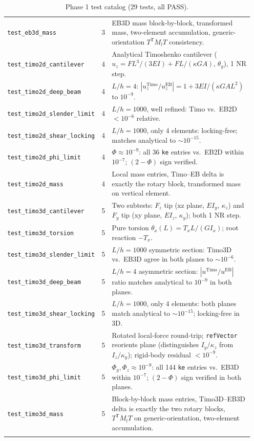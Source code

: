 \documentclass[11pt,a4paper]{book}
\begin{document}
\begin{longtable}{p{4.5cm} l p{8cm}}
\texttt{test\_eb3d\_mass}            & 3  & EB3D mass block-by-block, transformed mass, two-element accumulation, generic-orientation $T^\mathsf{T} M_l T$ consistency. \\
\texttt{test\_timo2d\_cantilever}    & 4  & Analytical Timoshenko cantilever ($u_z = FL^3/(3EI) + FL/(\kappa GA)$, $\theta_y$), 1 NR step. \\
\texttt{test\_timo2d\_deep\_beam}    & 4  & $L/h = 4$: $|u_z^{\text{Timo}}/u_z^{\text{EB}}| = 1 + 3 EI/(\kappa GA L^2)$ to $10^{-9}$. \\
\texttt{test\_timo2d\_slender\_limit}& 4  & $L/h = 1000$, well refined: Timo vs.\ EB2D $< 10^{-6}$ relative. \\
\texttt{test\_timo2d\_shear\_locking}& 4  & $L/h = 1000$, only 4 elements: locking-free; matches analytical to $\sim 10^{-15}$. \\
\texttt{test\_timo2d\_phi\_limit}    & 4  & $\Phi \approx 10^{-9}$: all 36 \texttt{ke} entries vs.\ EB2D within $10^{-7}$; $(2-\Phi)$ sign verified. \\
\texttt{test\_timo2d\_mass}          & 4  & Local mass entries, Timo--EB delta is exactly the rotary block, transformed mass on vertical element. \\
\texttt{test\_timo3d\_cantilever}    & 5  & Two subtests: $F_z$ tip (xz plane, $E I_y$, $\kappa_z$) and $F_y$ tip (xy plane, $E I_z$, $\kappa_y$); both 1 NR step. \\
\texttt{test\_timo3d\_torsion}       & 5  & Pure torsion $\theta_x(L) = T_x L/(GI_x)$; root reaction $-T_x$. \\
\texttt{test\_timo3d\_slender\_limit}& 5  & $L/h = 1000$ symmetric section: Timo3D vs.\ EB3D agree in both planes to $\sim 10^{-6}$. \\
\texttt{test\_timo3d\_deep\_beam}    & 5  & $L/h = 4$ asymmetric section: $|u^{\text{Timo}}/u^{\text{EB}}|$ ratio matches analytical to $10^{-9}$ in both planes. \\
\texttt{test\_timo3d\_shear\_locking}& 5  & $L/h = 1000$, only 4 elements: both planes match analytical to $\sim 10^{-15}$; locking-free in 3D. \\
\texttt{test\_timo3d\_transform}     & 5  & Rotated local-force round-trip; \texttt{refVector} reorients plane (distinguishes $I_y/\kappa_z$ from $I_z/\kappa_y$); rigid-body residual $< 10^{-9}$. \\
\texttt{test\_timo3d\_phi\_limit}    & 5  & $\Phi_y, \Phi_z \approx 10^{-9}$: all 144 \texttt{ke} entries vs.\ EB3D within $10^{-7}$; $(2-\Phi)$ sign verified in both planes. \\
\texttt{test\_timo3d\_mass}          & 5  & Block-by-block mass entries, Timo3D--EB3D delta is exactly the two rotary blocks, $T^\mathsf{T} M_l T$ on generic-orientation, two-element accumulation. \\
\bottomrule
\caption{Phase 1 test catalog (29 tests, all PASS).}
\end{longtable}
\end{document}
